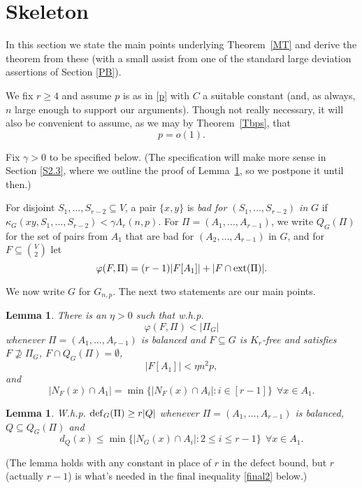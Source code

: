\documentclass[letterpaper,11pt]{article}
\newtheorem{lemma}[thm]{Lemma}
\newcommand{\beq}[1]{\begin{equation}\label{#1}}
\newcommand{\enq}[0]{\end{equation}}
\newcommand{\nin}[0]{\noindent}
\newcommand{\sub}[0]{\subseteq}
\renewcommand{\dots}[0]{,\ldots,}
\newcommand{\ext}[0]{{\rm ext}}
\newcommand{\deff}[0]{{\rm def}}
\newcommand{\0}[0]{\emptyset}
\newcommand{\C}[2]{{{#1}\choose{{#2}}}}
\newcommand{\gc}[0]{\gamma }
\newcommand{\gL}[0]{\Lambda}
\newcommand{\vp}[0]{\varphi}
\newcommand{\glr}[0]{\gL_r(n,p)}
\begin{document}
\section{Skeleton}\label{Skeleton}

In this section we state the main points underlying
Theorem~\ref{MT} and derive the theorem from these
(with a small assist from one of the standard large
deviation assertions of Section \ref{PB}).



We fix $r\geq 4$ and
assume
$p$ is as in \eqref{p}
with
$C$ a suitable constant
(and, as always,
$n$ large enough to support our arguments).
Though not really necessary, it will also be
convenient to assume, as we may by
Theorem~\ref{Tbps}, that
\beq{po1}
p=o(1).
\enq






Fix $\gc>0$ to be specified below.
(The specification will make more sense in
Section \ref{S2.3}, where we outline the proof of
Lemma~\ref{L2.3}, so we postpone it until then.)


For disjoint
$S_1\dots S_{r-2}\sub V$, a pair
$\{x,y\}$ is
{\em bad for $(S_1\dots S_{r-2})$ in} $G$ if
$\kappa_G(xy,S_1\dots S_{r-2})< \gc \glr$.
For $\Pi=(A_1\dots A_{r-1})$, we write
$Q_G(\Pi)$ for the set of pairs from $A_1$ that are
bad for $(A_2\dots A_{r-1})$ in $G$, and for
$F\sub \C{V}{2}$ let
\[\vp(F,\Pi) = (r-1)|F[A_1]| +|F\cap \ext(\Pi)|. \]

We now write $G$ for $G_{n,p}$.
The next two statements are our main points.


\begin{lemma}\label{L2.2}
There is an $\eta>0$ such that
w.h.p.
\[\vp(F,\Pi) < |\Pi_G|\]
whenever $\Pi=(A_1\dots A_{r-1})$
is balanced
and $F\sub G$ is
$K_r$-free and satisfies $F\not\supseteq \Pi_G$, $F\cap Q_G(\Pi)=\0$,
\beq{HP2}
|F[A_1]|<\eta n^2p,
\enq
and
\beq{HP3}
|N_F(x)\cap A_1|=\min\{|N_F(x)\cap A_i|:i\in [r-1]\}
~~\forall x\in A_1.
\enq
\end{lemma}




\begin{lemma}\label{L2.3}
W.h.p. $\deff_G(\Pi) \geq r |Q|$ whenever
$\Pi=(A_1\dots A_{r-1})$
is balanced, $Q\sub Q_G(\Pi)$
and
\beq{dQx'}
d_Q(x) \leq \min\{|N_G(x)\cap A_i|:2\leq i\leq r-1\}
~~\forall x\in A_1.
\enq
\end{lemma}
\nin
(The lemma holds with any constant in place of
$r$ in the defect bound, but $r$ (actually $r-1$) is
what's needed in
the final inequality \eqref{final2} below.)
\end{document}
